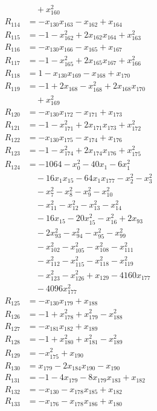\begin{align*}
&\quad{}+x_{160}^{2}\\
R_{114}&=-x_{130}x_{163}-x_{162}+x_{164}\\
R_{115}&=-1-x_{162}^{2}+2x_{162}x_{164}+x_{163}^{2}\\
R_{116}&=-x_{130}x_{166}-x_{165}+x_{167}\\
R_{117}&=-1-x_{165}^{2}+2x_{165}x_{167}+x_{166}^{2}\\
R_{118}&=1-x_{130}x_{169}-x_{168}+x_{170}\\
R_{119}&=-1+2x_{168}-x_{168}^{2}+2x_{168}x_{170}\\
&\quad{}+x_{169}^{2}\\
R_{120}&=-x_{130}x_{172}-x_{171}+x_{173}\\
R_{121}&=-1-x_{171}^{2}+2x_{171}x_{173}+x_{172}^{2}\\
R_{122}&=-x_{130}x_{175}-x_{174}+x_{176}\\
R_{123}&=-1-x_{174}^{2}+2x_{174}x_{176}+x_{175}^{2}\\
R_{124}&=-1064-x_{0}^{2}-40x_{1}-6x_{1}^{2}\\
&\quad{}-16x_{1}x_{15}-64x_{1}x_{177}-x_{2}^{2}-x_{3}^{2}\\
&\quad{}-x_{7}^{2}-x_{8}^{2}-x_{9}^{2}-x_{10}^{2}\\
&\quad{}-x_{11}^{2}-x_{12}^{2}-x_{13}^{2}-x_{14}^{2}\\
&\quad{}-16x_{15}-20x_{15}^{2}-x_{16}^{2}+2x_{93}\\
&\quad{}-2x_{93}^{2}-x_{94}^{2}-x_{95}^{2}-x_{99}^{2}\\
&\quad{}-x_{102}^{2}-x_{105}^{2}-x_{108}^{2}-x_{111}^{2}\\
&\quad{}-x_{112}^{2}-x_{115}^{2}-x_{118}^{2}-x_{119}^{2}\\
&\quad{}-x_{123}^{2}-x_{126}^{2}+x_{129}-4160x_{177}\\
&\quad{}-4096x_{177}^{2}\\
R_{125}&=-x_{130}x_{179}+x_{188}\\
R_{126}&=-1+x_{178}^{2}+x_{179}^{2}-x_{188}^{2}\\
R_{127}&=-x_{181}x_{182}+x_{189}\\
R_{128}&=-1+x_{180}^{2}+x_{181}^{2}-x_{189}^{2}\\
R_{129}&=-x_{175}^{2}+x_{190}\\
R_{130}&=x_{179}-2x_{184}x_{190}-x_{190}\\
R_{131}&=-1-4x_{179}-8x_{179}x_{183}+x_{182}\\
R_{132}&=-x_{130}-x_{178}x_{185}+x_{182}\\
R_{133}&=-x_{176}-x_{178}x_{186}+x_{180}\\

\end{align*}
